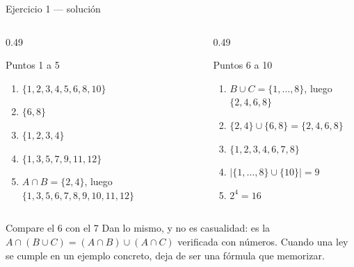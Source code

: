 \documentclass[aspectratio=169,10pt]{beamer}
\begin{document}
\begin{frame}{Ejercicio 1 — solución}
  \tiny
  \begin{columns}[T,onlytextwidth]
    \begin{column}{0.49\textwidth}
      \begin{block}{Puntos 1 a 5}
        \tiny
        \begin{enumerate}\setlength{\itemsep}{-0.02cm}
          \item $\{1,2,3,4,5,6,8,10\}$
          \item $\{6,8\}$
          \item $\{1,2,3,4\}$
          \item $\{1,3,5,7,9,11,12\}$
          \item $A\cap B = \{2,4\}$, luego
                $\{1,3,5,6,7,8,9,10,11,12\}$
        \end{enumerate}
      \end{block}
    \end{column}
    \begin{column}{0.49\textwidth}
      \begin{block}{Puntos 6 a 10}
        \tiny
        \begin{enumerate}\setlength{\itemsep}{-0.02cm}
          \setcounter{enumi}{5}
          \item $B\cup C = \{1,\dots,8\}$, luego $\{2,4,6,8\}$
          \item $\{2,4\}\cup\{6,8\} = \{2,4,6,8\}$
          \item $\{1,2,3,4,6,7,8\}$
          \item $|\{1,\dots,8\}\cup\{10\}| = 9$
          \item $2^{4} = 16$
        \end{enumerate}
      \end{block}
    \end{column}
  \end{columns}

  \vspace{0.1cm}
  \begin{alertblock}{Compare el 6 con el 7}
    \tiny
    Dan lo mismo, y no es casualidad: es la 
    $A\cap(B\cup C) = (A\cap B)\cup(A\cap C)$ verificada con números. Cuando
    una ley se cumple en un ejemplo concreto, deja de ser una fórmula que
    memorizar.
  \end{alertblock}
\end{frame}
\end{document}
